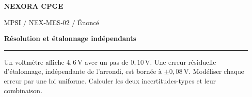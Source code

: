 \documentclass[11pt,a4paper]{article}
\begin{document}
{\small\bfseries\color{nexorablue} NEXORA CPGE}\par
{\small MPSI / NEX-MES-02 / Énoncé}\par
{\LARGE\bfseries Résolution et étalonnage indépendants}\par
\vspace{0.25em}\hrule\vspace{0.6em}

Un voltmètre affiche $4{,}6\,\mathrm V$ avec un pas de $0{,}10\,\mathrm V$. Une erreur résiduelle d’étalonnage, indépendante de l’arrondi, est bornée à $\pm0{,}08\,\mathrm V$. Modéliser chaque erreur par une loi uniforme. Calculer les deux incertitudes-types et leur combinaison.
\end{document}
